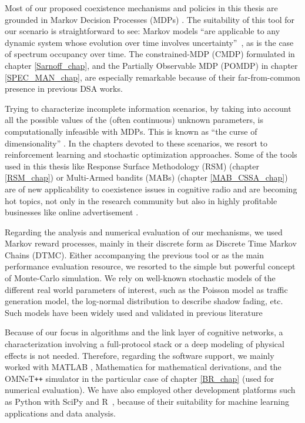 Most of our proposed coexistence mechanisms and policies in this thesis are grounded in Markov Decision Processes (MDPs) \cite{ref:Puterman2005}. 
The suitability of this tool for our scenario is straightforward to see: Markov models \enquote{are applicable to any dynamic system whose evolution over time involves uncertainty} \cite{ref:Bertsekas}, as is the case of spectrum occupancy over time. 
The constrained-MDP (CMDP) formulated in chapter \ref{Sarnoff_chap}, and the Partially Observable MDP (POMDP) in chapter \ref{SPEC_MAN_chap}, are especially remarkable because of their far-from-common presence in previous DSA works. 

Trying to characterize incomplete information scenarios, by taking into account all the possible values of the (often continuous) unknown parameters, is computationally infeasible with MDPs. 
This is known as \enquote{the curse of dimensionality} \cite{ref:Powell}. 
In the chapters devoted to these scenarios, we resort to reinforcement learning and stochastic optimization approaches. 
Some of the tools used in this thesis like Response Surface Methodology (RSM) (chapter \ref{RSM_chap}) or Multi-Armed bandits (MABs) (chapter \ref{MAB_CSSA_chap}) are of new applicability to coexistence issues in cognitive radio and are becoming hot topics, not only in the research community \cite{ref:Bkassiny2013} but also in highly profitable businesses like online advertisement \cite{ref:White2012}. 

Regarding the analysis and numerical evaluation of our mechanisms, we used Markov reward processes, mainly in their discrete form as Discrete Time Markov Chains (DTMC). Either accompanying the previous tool or as the main performance evaluation resource, we resorted to the simple but powerful concept of Monte-Carlo simulation.
We rely on well-known stochastic models of the different real world parameters of interest, such as the Poisson model as traffic generation model, the log-normal distribution to describe shadow fading, etc. Such models have been widely used and validated in previous literature \cite{ref:Goldsmith2}

Because of our focus in algorithms and the link layer of cognitive networks, a characterization involving a full-protocol stack or a deep modeling of physical effects is not needed. Therefore, regarding the software support, we mainly worked with MATLAB \cite{ref:MATLAB}, Mathematica \cite{ref:Mathematica} for mathematical derivations, and the OMNeT\verb!++! simulator \cite{ref:Omnet} in the particular case of chapter \ref{BR_chap} (used for numerical evaluation). We have also employed other development platforms such as Python with SciPy \cite{ref:SciPy} and R \cite{ref:RStudio}, because of their suitability for machine learning applications and data analysis.



